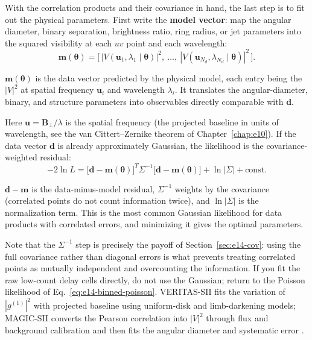 With the correlation products and their covariance in hand, the last step is to fit out the physical parameters. First write the \textbf{model vector}: map the angular diameter, binary separation, brightness ratio, ring radius, or jet parameters into the squared visibility at each $uv$ point and each wavelength:
\begin{equation}
  \bm m(\bm\theta)
  =\Big[\,|V(\bm u_1,\lambda_1\mid\bm\theta)|^2,\ \ldots,\ |V(\bm u_{N_d},\lambda_{N_d}\mid\bm\theta)|^2\,\Big] .
  \label{eq:e14-model}
\end{equation}
\begin{formulaexplain}
$\bm m(\bm\theta)$ is the data vector predicted by the physical model, each entry being the $|V|^2$ at spatial frequency $\bm u_i$ and wavelength $\lambda_i$. It translates the angular-diameter, binary, and structure parameters into observables directly comparable with $\bm d$.
\end{formulaexplain}
Here $\bm u=\bm B_\perp/\lambda$ is the spatial frequency (the projected baseline in units of wavelength, see the van Cittert--Zernike theorem of Chapter~\ref{chap:e10}). If the data vector $\bm d$ is already approximately Gaussian, the likelihood is the covariance-weighted residual:
\begin{equation}
  -2\ln L
  =\big[\bm d-\bm m(\bm\theta)\big]^{T}\Sigma^{-1}\big[\bm d-\bm m(\bm\theta)\big]
   +\ln|\Sigma|+\text{const} .
  \label{eq:e14-gauss}
\end{equation}
\begin{formulaexplain}
$\bm d-\bm m$ is the data-minus-model residual, $\Sigma^{-1}$ weights by the covariance (correlated points do not count information twice), and $\ln|\Sigma|$ is the normalization term. This is the most common Gaussian likelihood for data products with correlated errors, and minimizing it gives the optimal parameters.
\end{formulaexplain}
Note that the $\Sigma^{-1}$ step is precisely the payoff of Section~\ref{sec:e14-cov}: using the full covariance rather than diagonal errors is what prevents treating correlated points as mutually independent and overcounting the information. If you fit the raw low-count delay cells directly, do not use the Gaussian; return to the Poisson likelihood of Eq.~\eqref{eq:e14-binned-poisson}. VERITAS-SII fits the variation of $|g^{(1)}|^2$ with projected baseline using uniform-disk and limb-darkening models; MAGIC-SII converts the Pearson correlation into $|V|^2$ through flux and background calibration and then fits the angular diameter and systematic error \citep{2020NatAs...4.1164A,2024MNRAS.529.4387A,1967MNRAS.137..375H}.

